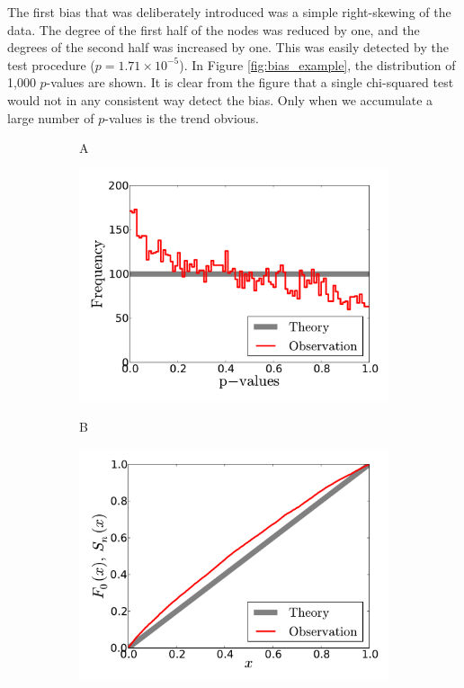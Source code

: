 The first bias that was deliberately introduced was a simple right-skewing of the data. The degree of the first half of the nodes was reduced by one, and the degrees of the second half was increased by one. This was easily detected by the test procedure ($p = 1.71 \times 10^{-5}$). In Figure \ref{fig:bias_example}, the distribution of 1,000 $p$-values are shown. It is clear from the figure that a single chi-squared test would not in any consistent way detect the bias. Only when we accumulate a large number of $p$-values is the trend obvious. 
\begin{figure}[b]
\centering
\begin{subfigure}[b]{0.49\textwidth}
	  \begin{flushleft}
	  \large A
		\end{flushleft}
    \centering
    \includegraphics[width=\textwidth]{RCC_bias_hist.pdf}
    \label{subfig:bias_hist}
\end{subfigure}
\begin{subfigure}[b]{0.49\textwidth}
	  \begin{flushleft}
	  \large B
		\end{flushleft}
    \centering
    \includegraphics[width=\textwidth]{RCC_bias_CDF.pdf}

\end{subfigure}
\end{figure}
